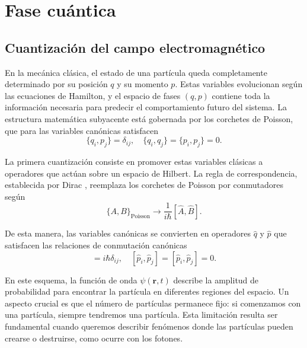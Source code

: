 \chapter{Fase cuántica}
\thispagestyle{fancy}
\fancyhead[L]{\leftmark}

    \section{Cuantización del campo electromagnético}

        En la mecánica clásica, el estado de una partícula queda completamente determinado por su posición $q$ y su momento $p$. Estas variables evolucionan según las ecuaciones de Hamilton, y el espacio de fases $(q, p)$ contiene toda la información necesaria para predecir el comportamiento futuro del sistema. La estructura matemática subyacente está gobernada por los corchetes de Poisson, que para las variables canónicas satisfacen
        \begin{equation}
            \{q_i, p_j\} = \delta_{ij}, \quad \{q_i, q_j\} = \{p_i, p_j\} = 0.
        \end{equation}
        
        La primera cuantización consiste en promover estas variables clásicas a operadores que actúan sobre un espacio de Hilbert. La regla de correspondencia, establecida por Dirac \cite{Dirac1930}, reemplaza los corchetes de Poisson por conmutadores según
        \begin{equation}
            \{A, B\}_{\text{Poisson}} \longrightarrow \frac{1}{i\hbar}[\hat{A}, \hat{B}].
        \end{equation}
        
        De esta manera, las variables canónicas se convierten en operadores $\hat{q}$ y $\hat{p}$ que satisfacen las relaciones de conmutación canónicas
        \begin{equation}
            [\hat{p}_i, \hat{p}_j] = i\hbar\delta_{ij}, \quad [\hat{p}_i, \hat{p}_j] = [\hat{p}_i, \hat{p}_j] = 0.
        \end{equation}
        
        En este esquema, la función de onda $\psi(\mathbf{r}, t)$ describe la amplitud de probabilidad para encontrar la partícula en diferentes regiones del espacio. Un aspecto crucial es que el número de partículas permanece fijo: si comenzamos con una partícula, siempre tendremos una partícula. Esta limitación resulta ser fundamental cuando queremos describir fenómenos donde las partículas pueden crearse o destruirse, como ocurre con los fotones.

